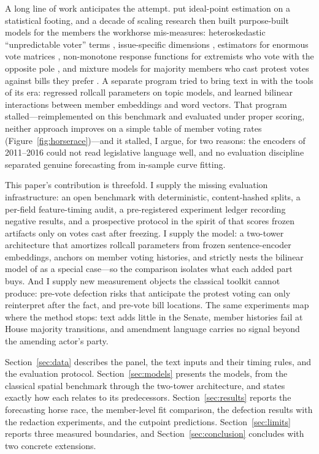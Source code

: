 \documentclass[12pt]{article}
\begin{document}
A long line of work anticipates the attempt.
\citet{clinton2004statistical} put ideal-point estimation on a
statistical footing, and a decade of scaling research then built
purpose-built models for the members the workhorse mis-measures:
heteroskedastic ``unpredictable voter'' terms
\citep{lauderdale2010unpredictable}, issue-specific dimensions
\citep{lauderdale2014scaling}, estimators for enormous vote matrices
\citep{imai2016fast}, non-monotone response functions for extremists who
vote with the opposite pole \citep{duckmayr2023ends}, and mixture models
for majority members who cast protest votes against bills they prefer
\citep{fowler2026protest}. A separate program tried to bring text in
with the tools of its era: \citet{gerrish2011predicting} regressed
rollcall parameters on topic models, and \citet{kraft2016embedding}
learned bilinear interactions between member embeddings and word
vectors. That program stalled---reimplemented on this benchmark and
evaluated under proper scoring, neither approach improves on a simple
table of member voting rates (Figure~\ref{fig:horserace})---and it
stalled, I argue, for two reasons: the encoders of 2011--2016 could not
read legislative language well, and no evaluation discipline separated
genuine forecasting from in-sample curve fitting.

This paper's contribution is threefold. I supply the missing
evaluation infrastructure: an open benchmark with deterministic,
content-hashed splits, a per-field feature-timing audit, a
pre-registered experiment ledger recording negative results, and a
prospective protocol in the spirit of \citet{dwork2015holdout} that
scores frozen artifacts only on votes cast after freezing. I supply the
model: a two-tower architecture that amortizes rollcall parameters from
frozen sentence-encoder embeddings, anchors on member voting histories,
and strictly nests the bilinear model of \citet{kraft2016embedding} as a
special case---so the comparison isolates what each added part buys. And
I supply new measurement objects the classical toolkit cannot produce:
pre-vote defection risks that anticipate the protest voting
\citet{fowler2026protest} can only reinterpret after the fact, and
pre-vote bill locations. The same experiments map where the method
stops: text adds little in the Senate, member histories fail at House
majority transitions, and amendment language carries no signal beyond
the amending actor's party.

Section~\ref{sec:data} describes the panel, the text inputs and their
timing rules, and the evaluation protocol. Section~\ref{sec:models}
presents the models, from the classical spatial benchmark through the
two-tower architecture, and states exactly how each relates to its
predecessors. Section~\ref{sec:results} reports the forecasting horse
race, the member-level fit comparison, the defection results with the
redaction experiments, and the cutpoint predictions.
Section~\ref{sec:limits} reports three measured boundaries, and
Section~\ref{sec:conclusion} concludes with two concrete extensions.
\end{document}
